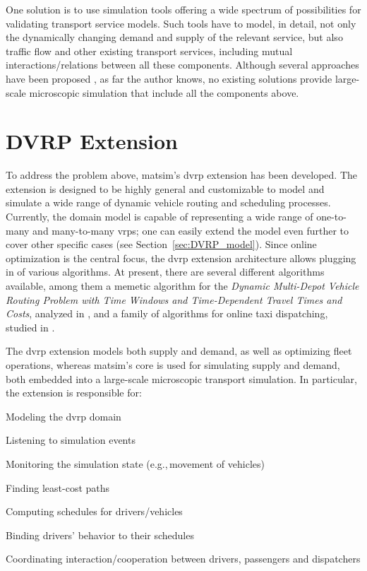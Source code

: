 One solution is to use simulation tools offering a wide spectrum of possibilities for validating transport service models. Such tools have to model, in detail, not only the dynamically changing demand and supply of the relevant service, but also traffic flow and other existing transport services, including mutual interactions/relations between all these components. Although several approaches have been proposed \citep[e.g.,][]{ReganMahmassaniJaillet1998DynamicFleetManagementSimulation, BarceloEtc2007RoutingSchedulingSimulationLogistics, LiaoEtc2008ObjOrFramework4DVRP,Certicky:2014:AST:2615731.2616118}, as far the author knows, no existing solutions provide large-scale microscopic simulation that include all the components above.

\section{DVRP Extension}
To address the problem above, \gls{matsim}'s \gls{dvrp} \gls{extension} has been developed. The \gls{extension} is designed to be highly general and customizable to model and simulate a wide range of dynamic vehicle routing and scheduling processes. Currently, the domain model is capable of representing a wide range of one-to-many and many-to-many \glspl{vrp}; one can easily extend the model even further to cover other specific cases (see Section~\ref{sec:DVRP_model}). Since online optimization is the central focus, the \gls{dvrp} extension architecture allows plugging in of various algorithms. At present, there are several different algorithms available, among them a memetic  algorithm for the \emph{Dynamic Multi-Depot Vehicle Routing Problem with Time Windows and Time-Dependent Travel Times and Costs}, analyzed in \citep{MaciejewskiNagel2012OfflineDVRPMATSimPPAM}, and a family of algorithms for online taxi dispatching, studied in \citep{ MaciejewskiNagel2013TaxiSimulation, MaciejewskiNagel2013OnlineTaxisVSPWP, MaciejewskiNagel2013CooperationTaxiDispatching, Maciejewski2014OnlineViaOffline}.

The \gls{dvrp} extension models both supply and demand, as well as optimizing fleet operations, whereas \gls{matsim}'s core is used for simulating supply and demand, both embedded into a large-scale microscopic transport simulation. In particular, the extension is responsible for:
%
\begin{compactitem}
	\item Modeling the \gls{dvrp} domain
	\item Listening to simulation events
	\item Monitoring the simulation state (e.g.,\,movement of vehicles)
	\item Finding least-cost paths
	\item Computing schedules for drivers/vehicles
	\item Binding drivers' behavior to their schedules
	\item Coordinating interaction/cooperation between drivers, passengers and dispatchers
\end{compactitem}

